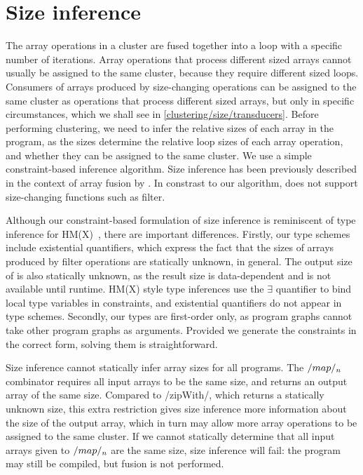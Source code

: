 \section{Size inference}
The array operations in a cluster are fused together into a loop with a specific number of iterations.
Array operations that process different sized arrays cannot usually be assigned to the same cluster, because they require different sized loops.
Consumers of arrays produced by size-changing operations can be assigned to the same cluster as operations that process different sized arrays, but only in specific circumstances, which we shall see in \cref{clustering/size/transducers}.
Before performing clustering, we need to infer the relative sizes of each array in the program, as the sizes determine the relative loop sizes of each array operation, and whether they can be assigned to the same cluster.
We use a simple constraint-based inference algorithm.
Size inference has been previously described in the context of array fusion by \citet{chatterjee1991size}.
In constrast to our algorithm, \citet{chatterjee1991size} does not support size-changing functions such as filter.

Although our constraint-based formulation of size inference is reminiscent of type inference for HM(X)~\cite{odersky1999type}, there are important differences.
Firstly, our type schemes include existential quantifiers, which express the fact that the sizes of arrays produced by filter operations are statically unknown, in general.
The output size of \Hs@generate@ is also statically unknown, as the result size is data-dependent and is not available until runtime.
HM(X) style type inferences use the $\exists$ quantifier to bind local type variables in constraints, and existential quantifiers do not appear in type schemes.
Secondly, our types are first-order only, as program graphs cannot take other program graphs as arguments.
Provided we generate the constraints in the correct form, solving them is straightforward.

Size inference cannot statically infer array sizes for all programs.
The $\Hs/map/_n$ combinator requires all input arrays to be the same size, and returns an output array of the same size.
Compared to \Hs/zipWith/, which returns a statically unknown size, this extra restriction gives size inference more information about the size of the output array, which in turn may allow more array operations to be assigned to the same cluster.
If we cannot statically determine that all input arrays given to $\Hs/map/_n$ are the same size, size inference will fail: the program may still be compiled, but fusion is not performed.

